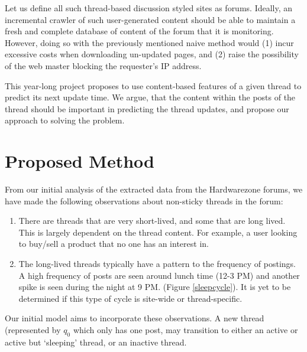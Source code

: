 \documentclass[]{homework}
\begin{document}
Let us define all such thread-based discussion styled sites as forums. Ideally, an incremental crawler of such user-generated content should be able to maintain a fresh and complete database of content of the forum that it is monitoring. However, doing so with the previously mentioned naive method would (1) incur excessive costs when downloading un-updated pages, and (2) raise the possibility of the web master blocking the requester's IP address.

This year-long project proposes to use content-based features of a given thread to predict its next update time. We argue, that the content within the posts of the thread should be important in predicting the thread updates, and propose our approach to solving the problem.


\section{Proposed Method}

From our initial analysis of the extracted data from the Hardwarezone forums, we have made the following observations about non-sticky threads in the forum:
\begin{enumerate}
	\item There are threads that are very short-lived, and some that are long lived. This is largely dependent on the thread content. For example, a user looking to buy/sell a product that no one has an interest in. %
	\item The long-lived threads typically have a pattern to the frequency of postings. A high frequency of posts are seen around lunch time (12-3 PM) and another spike is seen during the night at 9 PM. (Figure \ref{sleepcycle}). It is yet to be determined if this type of cycle is site-wide or thread-specific.
\end{enumerate}
Our initial model aims to incorporate these observations. A new thread (represented by $q_0$ which only has one post, may transition to either an active or active but `sleeping' thread, or an inactive thread.
\end{document}
